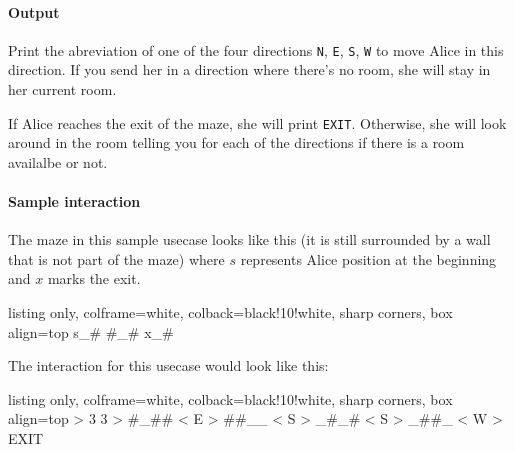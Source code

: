 \paragraph*{Output}

Print the abreviation of one of the four directions \texttt{N}, \texttt{E}, \texttt{S}, \texttt{W} to move Alice in this direction. If you send her in a direction where there's no room, she will stay in her current room.

If Alice reaches the exit of the maze, she will print \texttt{EXIT}. Otherwise, she will look around in the room telling you for each of the directions if there is a room availalbe or not.

\paragraph*{Sample interaction}

The maze in this sample usecase looks like this (it is still surrounded by a wall that is not part of the maze) where $s$ represents Alice position at the beginning and $x$ marks the exit.
\noindent\begin{tcblisting}{listing only, colframe=white, colback=black!10!white, sharp corners, box align=top}
s_#
#_#
x_#
\end{tcblisting}

The interaction for this usecase would look like this:

\noindent\begin{tcblisting}{listing only, colframe=white, colback=black!10!white, sharp corners, box align=top}
> 3 3
> #_##
< E
> ##__
< S
> _#_#
< S
> _##_
< W
> EXIT
\end{tcblisting}


